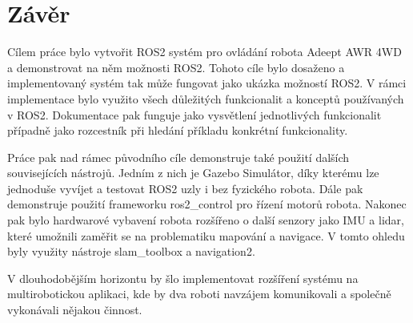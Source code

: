 \chapter{Závěr}
Cílem práce bylo vytvořit ROS2 systém pro ovládání robota Adeept AWR 4WD a demonstrovat na něm možnosti ROS2. Tohoto cíle bylo dosaženo a implementovaný systém tak může fungovat jako ukázka možností ROS2. V rámci implementace bylo využito všech důležitých funkcionalit a konceptů používaných v ROS2. Dokumentace pak funguje jako vysvětlení jednotlivých funkcionalit případně jako rozcestník při hledání příkladu konkrétní funkcionality.

Práce pak nad rámec původního cíle demonstruje také použití dalších souvisejících nástrojů. Jedním z nich je Gazebo Simulátor, díky kterému lze jednoduše vyvíjet a testovat ROS2 uzly i bez fyzického robota. Dále pak demonstruje použití frameworku ros2\_control pro řízení motorů robota. Nakonec pak bylo hardwarové vybavení robota rozšířeno o další senzory jako IMU a lidar, které umožnili zaměřit se na problematiku mapování a navigace. V tomto ohledu byly využity nástroje slam\_toolbox a navigation2.

V dlouhodobějším horizontu by šlo implementovat rozšíření systému na multirobotickou aplikaci, kde by dva roboti navzájem komunikovali a společně vykonávali nějakou činnost.


%
